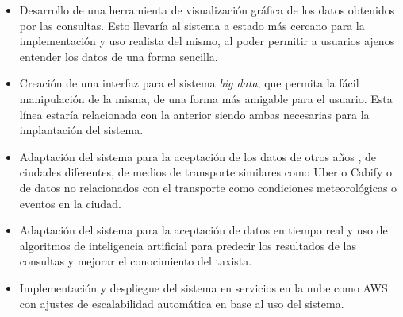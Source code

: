 \begin{itemize}
\item Desarrollo de una herramienta de visualización gráfica de los datos obtenidos por las consultas. Esto llevaría al sistema a estado más cercano para la implementación y uso realista del mismo, al poder permitir a usuarios ajenos entender los datos de una forma sencilla.

\item Creación de una interfaz para el sistema \textit{big data}, que permita la fácil manipulación de la misma, de una forma más amigable para el usuario. Esta línea estaría relacionada con la anterior siendo ambas necesarias para la implantación del sistema.

\item Adaptación del sistema para la aceptación de los datos de otros años \cite{taxiTrips}, de ciudades diferentes, de medios de transporte similares como Uber o Cabify o de datos no relacionados con el transporte como condiciones meteorológicas o eventos en la ciudad. 

\item Adaptación del sistema para la aceptación de datos en tiempo real y uso de algoritmos de inteligencia artificial para predecir los resultados de las consultas y mejorar el conocimiento del taxista.

\item Implementación y despliegue del sistema en servicios en la nube como \gls{AWS} con ajustes de escalabilidad automática en base al uso del sistema.
\end{itemize}